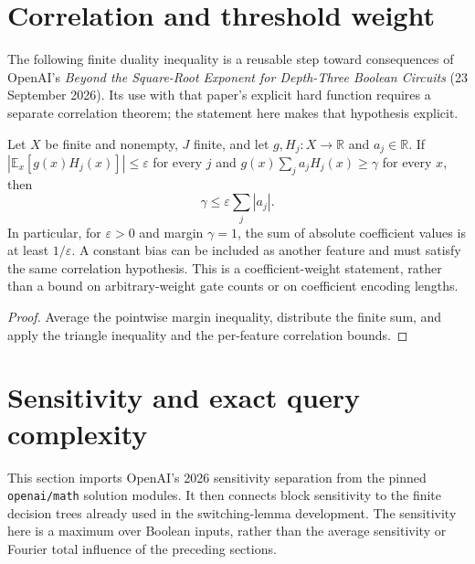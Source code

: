 \section{Correlation and threshold weight}
\label{sec:analysis-threshold-weight}

The following finite duality inequality is a reusable step toward consequences
of OpenAI's \emph{Beyond the Square-Root Exponent for Depth-Three Boolean
Circuits} (23 September 2026). Its use with that paper's explicit hard function
requires a separate correlation theorem; the statement here makes that
hypothesis explicit.

\begin{theorem}
  \label{thm:analysis-correlation-threshold-weight}
  \leanok
  Let $X$ be finite and nonempty, $J$ finite, and let
  $g,H_j:X\to\mathbb R$ and $a_j\in\mathbb R$. If
  $|\mathbb E_x[g(x)H_j(x)]|\le\varepsilon$ for every $j$ and
  $g(x)\sum_j a_jH_j(x)\ge\gamma$ for every $x$, then
  \[
    \gamma\le\varepsilon\sum_j|a_j|.
  \]
  In particular, for $\varepsilon>0$ and margin $\gamma=1$, the sum of
  absolute coefficient values is at least $1/\varepsilon$.
  A constant bias can be included as another feature and must satisfy the
  same correlation hypothesis. This is a coefficient-weight statement,
  rather than a bound on arbitrary-weight gate counts or on coefficient
  encoding lengths.
\end{theorem}
\begin{proof}
  \leanok
  Average the pointwise margin inequality, distribute the finite sum, and
  apply the triangle inequality and the per-feature correlation bounds.
\end{proof}

\section{Sensitivity and exact query complexity}
\label{sec:analysis-sensitivity}

This section imports OpenAI's 2026 sensitivity separation from the pinned
\texttt{openai/math} solution modules. It then connects block sensitivity to
the finite decision trees already used in the switching-lemma development.
The sensitivity here is a maximum over Boolean inputs, rather than the
average sensitivity or Fourier total influence of the preceding sections.

